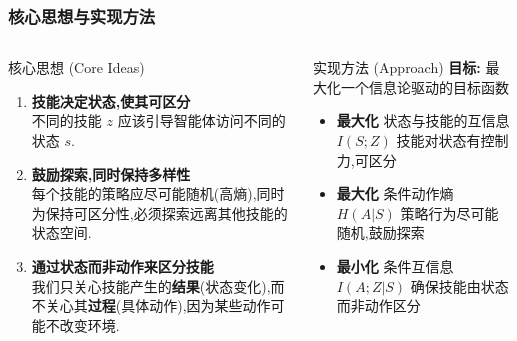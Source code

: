 \documentclass{beamer}
\begin{document}
\begin{frame}
    \tiny
    \frametitle{核心思想与实现方法}
    \begin{columns}[T]
        \begin{column}{0.6\textwidth}
            \begin{block}{核心思想 (Core Ideas)}
                \begin{enumerate}
                    \item \textbf{技能决定状态,使其可区分} \\
                    不同的技能 $z$ 应该引导智能体访问不同的状态 $s$.
                    \vspace{0.2cm}
                    
                    \item \textbf{鼓励探索,同时保持多样性} \\
                    每个技能的策略应尽可能随机(高熵),同时为保持可区分性,必须探索远离其他技能的状态空间.
                    \vspace{0.2cm}
                    
                    \item \textbf{通过状态而非动作来区分技能} \\
                    我们只关心技能产生的\textbf{结果}(状态变化),而不关心其\textbf{过程}(具体动作),因为某些动作可能不改变环境.
                \end{enumerate}
            \end{block}
        \end{column}

         \begin{column}{0.4\textwidth}
            \tiny
            \begin{block}{实现方法 (Approach)}
                \textbf{目标:} 最大化一个信息论驱动的目标函数
                \begin{itemize}
                    \item \textbf{最大化} 状态与技能的互信息 $I(S; Z)$ 
                     技能对状态有控制力,可区分
                    \vspace{0.2cm}
                    
                    \item \textbf{最大化} 条件动作熵 $H(A|S)$ 
                      策略行为尽可能随机,鼓励探索
                    \vspace{0.2cm}
                    
                    \item \textbf{最小化} 条件互信息 $I(A; Z | S)$ 
                     确保技能由状态而非动作区分
                \end{itemize}
            \end{block}
        \end{column}
    \end{columns}


\end{frame}
\end{document}
